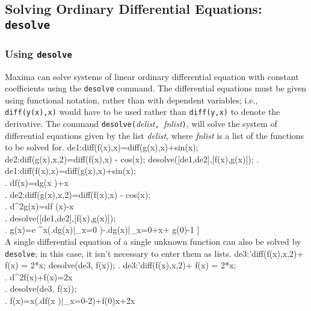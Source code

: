 \subsection{Solving Ordinary Differential Equations: \texttt{desolve}}
\label{subsec:desolve}

\subsubsection{Using \texttt{desolve}}

Maxima can solve systems of linear ordinary differential equation
with constant coefficients
using the  \texttt{desolve} command. The differential
equations must be given using functional notation, rather than with
dependent variables; i.e., \texttt{diff(y(x),x)} would have to be used
rather than \texttt{diff(y,x)} to denote the derivative.  
The command 
\texttt{desolve(}\textit{delist}\texttt{, }\textit{fnlist}\texttt{)},
will solve the system of differential equations given by the list
\textit{delist}, where \textit{fnlist} is a list of the functions to
be solved for.
\beginmaximasession
de1:diff(f(x),x)=diff(g(x),x)+sin(x);
de2:diff(g(x),x,2)=diff(f(x),x) - cos(x);
desolve([de1,de2],[f(x),g(x)]);
\maximatexsession
{}.  de1:diff(f(x),x)=diff(g(x),x)+sin(x); \\
.   {{d}}\*f\left(x\right)={{d}}\*g\left(x
 \right)+\sin x \\
.  de2:diff(g(x),x,2)=diff(f(x),x) - cos(x); \\
.   {{d^{2}}}\*g\left(x\right)={{d}}\*f
 \left(x\right)-\cos x \\
.  desolve([de1,de2],[f(x),g(x)]); \\
.   \left[ f\left(x\right)=e^{x}\*\left(\left.{{d}\over{d\*x}}\*g
 \left(x\right)\right|_{x=0}\right)-\left.{{d}\over{d\*x}}\*g\left(x
 \right)\right|_{x=0}+f\left(0\right),\linebreak[0]g\left(x\right)=e
 ^{x}\*\left(\left.{{d}}\*g\left(x\right)\right|_{x=0}
 \right)-\left.{{d}}\*g\left(x\right)\right|_{x=0}+\cos x+
 g\left(0\right)-1 \right]  \\
\endmaximasession
\noindent
A single differential equation of a single unknown function can also
be solved by \texttt{desolve}; in this case, it isn't  
necessary to enter them as lists.
\beginmaximasession
de3:'diff(f(x),x,2)+ f(x) = 2*x;
desolve(de3, f(x));
\maximatexsession
{}.  de3:'diff(f(x),x,2)+ f(x) = 2*x; \\
.   {{d^{2}}}\*f\left(x\right)+f\left(x\right)=2\*x \\
.  desolve(de3, f(x)); \\
.   f\left(x\right)=\sin x\*\left(\left.{{d}}\*f\left(x
 \right)\right|_{x=0}-2\right)+f\left(0\right)\*\cos x+2\*x \\
\endmaximasession

